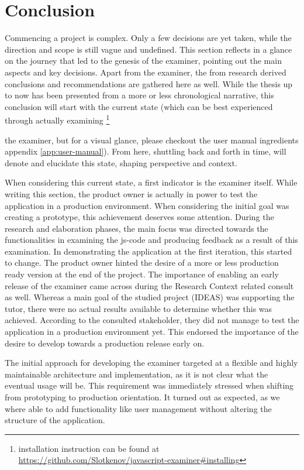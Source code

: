 \chapter{Conclusion}

Commencing a project is complex. Only a few decisions are yet taken, while
the direction and scope is still vague and undefined. This section reflects in a 
glance on the journey that led to the genesis of the \gls{examiner}, pointing 
out the main aspects and key decisions. Apart from the \gls{examiner}, the from 
research derived conclusions and recommendations are gathered here as well. 
While the thesis up to now has been presented from a more or less chronological
narrative, this conclusion will start with the current state (which can be best
experienced through actually 
examining \footnote{installation instruction can be found at
\url{https://github.com/Slotkenov/javascript-examiner\#installing}}

 the \gls{examiner}, but for a visual glance,
please checkout the user manual ingredients appendix \ref{app:user-manual}). From
here, shuttling back and forth in time, will denote and elucidate this state,
shaping perspective and context.


When considering this current state, a first indicator is the \gls{examiner}
itself. While writing this section, the product owner is actually in power to
test the application in a production environment. When considering the
initial goal was creating a prototype, this achievement deserves some attention.
During the research and elaboration phases, the main focus was directed towards 
the functionalities in examining the \gls{js-code} and producing \gls{feedback}
as a result of this examination. In demonstrating the application at the
first iteration, this started to change. The product owner hinted the desire of
a more or less production ready version at the end of the project. The 
importance of enabling an early release of the \gls{examiner} came across
during the Research Context related consult as well. Whereas a main goal of the
studied project (IDEAS) was supporting the \gls{tutor}, there were no actual
results available to determine whether this was achieved. According to the
consulted stakeholder, they did not manage to test the application in a 
production environment yet. This endorsed the importance of the desire to 
develop towards a production release early on.


The initial approach for developing the \gls{examiner} targeted at a flexible
and highly maintainable architecture and implementation, as it is not clear
what the eventual usage will be. This requirement was immediately stressed
when shifting from prototyping to production orientation. It turned out as
expected, as we where able to add functionality like user management without 
altering the structure of the application.


